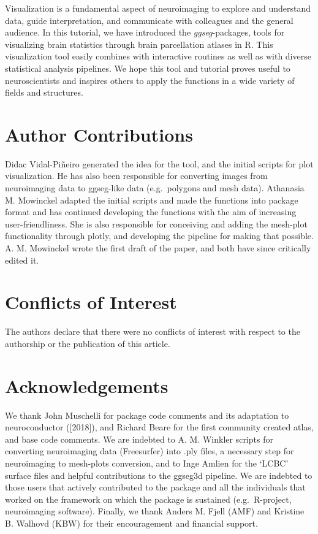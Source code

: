 \documentclass[fleqn,10pt]{wlpeerj} %
\begin{document}
Visualization is a fundamental aspect of neuroimaging to explore and understand data, guide interpretation, and communicate with colleagues and the general audience.
In this tutorial, we have introduced the \emph{ggseg}-packages, tools for visualizing brain statistics through brain parcellation atlases in R.
This visualization tool easily combines with interactive routines as well as with diverse statistical analysis pipelines.
We hope this tool and tutorial proves useful to neuroscientists and inspires others to apply the functions in a wide variety of fields and structures.

\hypertarget{author-contributions}{%
\section{Author Contributions}\label{author-contributions}}

Didac Vidal-Piñeiro generated the idea for the tool, and the initial scripts for plot visualization.
He has also been responsible for converting images from neuroimaging data to ggseg-like data (e.g.~polygons and mesh data).
Athanasia M. Mowinckel adapted the initial scripts and made the functions into package format and has continued developing the functions with the aim of increasing user-friendliness.
She is also responsible for conceiving and adding the mesh-plot functionality through plotly, and developing the pipeline for making that possible.
A. M. Mowinckel wrote the first draft of the paper, and both have since critically edited it.

\hypertarget{conflicts-of-interest}{%
\section{Conflicts of Interest}\label{conflicts-of-interest}}

The authors declare that there were no conflicts of interest with respect to the authorship or the publication of this article.

\hypertarget{acknowledgements}{%
\section{Acknowledgements}\label{acknowledgements}}

We thank John Muschelli for package code comments and its adaptation to neuroconductor ({[}2018{]}), and Richard Beare for the first community created atlas, and base code comments.
We are indebted to A. M. Winkler scripts for converting neuroimaging data (Freesurfer) into .ply files, a necessary step for neuroimaging to mesh-plots conversion, and to Inge Amlien for the `LCBC' surface files and helpful contributions to the ggseg3d pipeline.
We are indebted to those users that actively contributed to the package and all the individuals that worked on the framework on which the package is sustained (e.g.~R-project, neuroimaging software).
Finally, we thank Anders M. Fjell (AMF) and Kristine B. Walhovd (KBW) for their encouragement and financial support.
\end{document}
